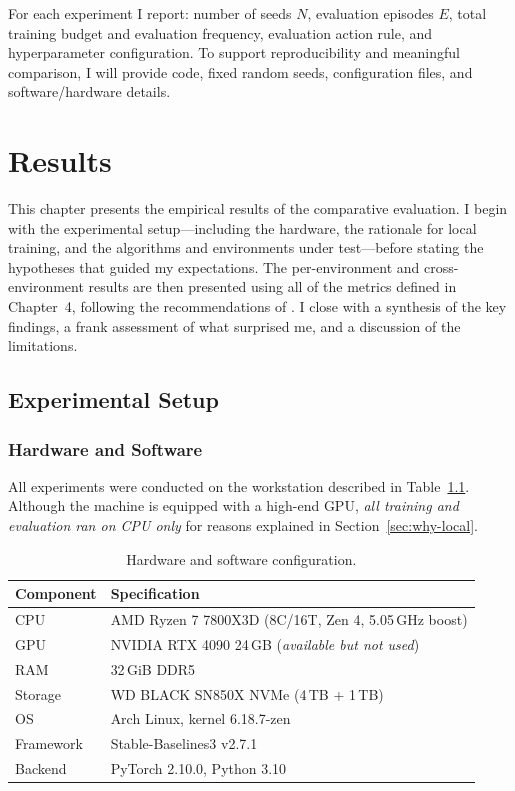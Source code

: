 For each experiment I report: number of seeds $N$, evaluation episodes $E$,
total training budget and evaluation frequency, evaluation action rule, and hyperparameter
configuration. To support reproducibility and meaningful comparison, I will provide
code, fixed random seeds, configuration files, and software/hardware details. \cite{henderson2018matters,colas2018seeds}


\chapter{Results}

This chapter presents the empirical results of the comparative evaluation.
I begin with the experimental setup---including the hardware, the
rationale for local training, and the algorithms and environments
under test---before stating the hypotheses that guided my expectations.
The per-environment and cross-environment results are then presented
using all of the metrics defined in Chapter~4, following the
recommendations of \citet{agarwal2021precipice}. I close with a
synthesis of the key findings, a frank assessment of what surprised me,
and a discussion of the limitations.

\section{Experimental Setup}
\label{sec:setup}

\subsection{Hardware and Software}
\label{sec:hardware}

All experiments were conducted on the workstation described in
Table~\ref{tab:hardware}. Although the machine is equipped with a
high-end GPU, \emph{all training and evaluation ran on CPU only}
for reasons explained in Section~\ref{sec:why-local}.

\begin{table}[htbp!]
\centering
\caption{Hardware and software configuration.}
\label{tab:hardware}
\begin{tabular}{ll}
\toprule
\textbf{Component}   & \textbf{Specification} \\
\midrule
CPU         & AMD Ryzen 7 7800X3D (8C/16T, Zen 4, 5.05\,GHz boost) \\
GPU         & NVIDIA RTX 4090 24\,GB (\emph{available but not used}) \\
RAM         & 32\,GiB DDR5 \\
Storage     & WD BLACK SN850X NVMe (4\,TB + 1\,TB) \\
OS          & Arch Linux, kernel 6.18.7-zen \\
Framework   & Stable-Baselines3 v2.7.1 \citep{raffin2021sb3} \\
Backend     & PyTorch 2.10.0, Python 3.10 \\
\bottomrule
\end{tabular}
\end{table}

